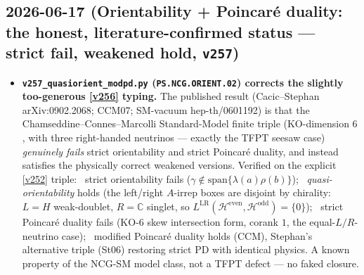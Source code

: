 \subsection*{2026-06-17 (Orientability + Poincar\'e duality: the honest, literature-confirmed status --- strict fail, weakened hold, \texttt{v257})}
\begin{itemize}
\item \textbf{\texttt{v257\_quasiorient\_modpd.py} (\texttt{PS.NCG.ORIENT.02}) corrects the slightly
  too-generous \vref{v256} typing.} The published result (Cacic--Stephan arXiv:0902.2068; CCM07;
  SM-vacuum hep-th/0601192) is that the Chamseddine--Connes--Marcolli Standard-Model finite triple
  (KO-dimension $6$, with three right-handed neutrinos --- exactly the TFPT seesaw case) \emph{genuinely
  fails} strict orientability and strict Poincar\'e duality, and instead satisfies the physically correct
  weakened versions. Verified on the explicit \vref{v252} triple: \mE\ strict orientability fails
  ($\gamma\notin\mathrm{span}\{\lambda(a)\rho(b)\}$); \mE\ \emph{quasi-orientability} holds (the left/right
  $A$-irrep boxes are disjoint by chirality: $L=H$ weak-doublet, $R=\mathbb C$ singlet, so
  $L^{\mathrm{LR}}(\mathcal H^{\mathrm{even}},\mathcal H^{\mathrm{odd}})=\{0\}$); \mE\ strict Poincar\'e
  duality fails (KO-$6$ skew intersection form, corank $1$, the equal-$L/R$-neutrino case); \mC\ modified
  Poincar\'e duality holds (CCM), Stephan's alternative triple (St06) restoring strict PD with identical
  physics. A known property of the NCG-SM model class, not a TFPT defect --- no faked closure.
\end{itemize}

